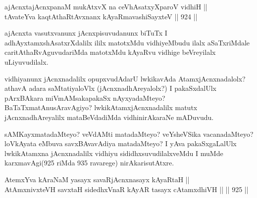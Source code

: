 
\begin{shl}
ajAcnxtajAcnxpanaM mukAtxvX na ceVhAsatxyXparoV vidhiH || \\
tAvateYva kaqtAthaRtAvxnanx kAyaRmavashiSayxteV \hfill || 924 ||  
\end{shl}

\begin{artha}
ajAcnxta vasutxvanunx jAcnxpisuvudanunx biTuTx I adhAyxtamxshAsatxrXdalilx ililx matotxMdu vidhiyeMbudu ilalx aSaTxriMdale caritAthaRvAguvudariMda matotxMdu kAyaRvu vidhige beVreyilalx uLiyuvudilalx.
\end{artha}

\begin{artha}
vidhiyanunx jAcnxnadalilx opupxvudAdarU lwkikavAda AtamxjAcnxnadalolx? athavA adara saMtatiyaloVlx (jAcnxnadhAreyalolx?) I pakaSxdalUlx pArxBAkara miVmAMsakapakaSx nAyxyadaMteyo? BaTaTxmatAnu\-sAravAgiyo? lwkikAtamxjAcnxnadalilx matutx jAcnxnadhAreyalilx mataBeVdadiMda vidhinirAkaraNe mADuvudu.
\end{artha}

\begin{artha}
sAMKayxmatadaMteyo? veVdAMti matadaMteyo? veYsheVSika vacanadaMteyo? loVkAyata eMbuva savxBAvavAdiya matadaMteyo? I yAva pakaSxgaLalUlx lwkikAtamxna jAcnxnadalilx vidhiyu sididhxsuvudilalxveMdu I muMde karxmavAgi(925 riMda 935 ravarege) nirAkarisutAtxre.
\end{artha}



\begin{shl}
AtemxYva kAraNaM yasayx savaRjAcnxnasayx kAyaRtaH || \\
AtAmxnivxteVH savxtaH sidedhxVnaR kAyAR tasayx cA\s \s tamxdhiVH ||  \hfill || 925 ||  
\end{shl}

